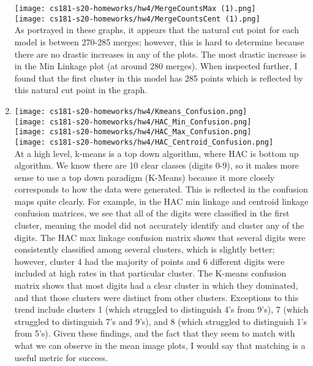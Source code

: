 \documentclass[submit]{harvardml}
\begin{document}
\begin{enumerate}
    \texttt{[image: cs181-s20-homeworks/hw4/MergeCountsMax (1).png]}\\
    \texttt{[image: cs181-s20-homeworks/hw4/MergeCountsCent (1).png]}\\
    As portrayed in these graphs, it appears that the natural cut point for each model is between 270-285 merges; however, this is hard to determine because there are no drastic increases in any of the plots. The most drastic increase is in the Min Linkage plot (at around 280 merges). When inspected further, I found that the first cluster in this model has 285 points which is reflected by this natural cut point in the graph. 
    \item \texttt{[image: cs181-s20-homeworks/hw4/Kmeans\_Confusion.png]}\\
    \texttt{[image: cs181-s20-homeworks/hw4/HAC\_Min\_Confusion.png]}\\
    \texttt{[image: cs181-s20-homeworks/hw4/HAC\_Max\_Confusion.png]}\\
    \texttt{[image: cs181-s20-homeworks/hw4/HAC\_Centroid\_Confusion.png]}\\
    At a high level, k-means is a top down algorithm, where HAC is bottom up algorithm. We know there are 10 clear classes (digits 0-9), so it makes more sense to use a top down paradigm (K-Means) because it more closely corresponds to how the data were generated. This is reflected in the confusion maps quite clearly. For example, in the HAC min linkage and centroid linkage confusion matrices, we see that all of the digits were classified in the first cluster, meaning the model did not accurately identify and cluster any of the digits. The HAC max linkage confusion matrix shows that several digits were consistently classified among several clusters, which is slightly better; however, cluster 4 had the majority of points and 6 different digits were included at high rates in that particular cluster. The K-means confusion matrix shows that most digits had a clear cluster in which they dominated, and that those clusters were distinct from other clusters. Exceptions to this trend include clusters 1 (which struggled to distinguish 4's from 9's), 7 (which struggled to distinguish 7's and 9's), and 8 (which struggled to distinguish 1's from 5's). Given these findings, and the fact that they seem to match with what we can observe in the mean image plots, I would say that matching is a useful metric for success.\\
\end{enumerate}
\end{document}
